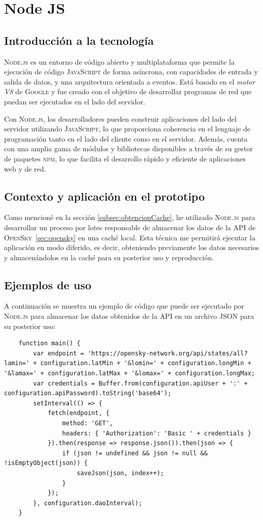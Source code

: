 \documentclass[a4paper, 11pt]{book}
\begin{document}
\section{Node JS}
\subsection{Introducción a la tecnología}
\textsc{Node.js} es un entorno de código abierto y multiplataforma que permite la ejecución de código \textsc{JavaScript} de forma asíncrona, con capacidades de entrada y salida de datos, y una arquitectura orientada a eventos. Está basado en el \emph{motor V8} de \textsc{Google} y fue creado con el objetivo de desarrollar programas de red que puedan ser ejecutados en el lado del servidor.

Con \textsc{Node.js}, los desarrolladores pueden construir aplicaciones del lado del servidor utilizando \textsc{JavaScript}, lo que proporciona coherencia en el lenguaje de programación tanto en el lado del cliente como en el servidor. Además, cuenta con una amplia gama de módulos y bibliotecas disponibles a través de su gestor de paquetes \textsc{\gls{npm}}, lo que facilita el desarrollo rápido y eficiente de aplicaciones web y de red.
\subsection{Contexto y aplicación en el prototipo}
Como mencioné en la sección \ref{subsec:obtencionCache}, he utilizado \textsc{Node.js} para desarrollar un proceso por lotes responsable de almacenar los datos de la \textsc{API} de \textsc{OpenSky}~\ref{sec:opensky} en una caché local. Esta técnica me permitirá ejecutar la aplicación en modo diferido, es decir, obteniendo previamente los datos necesarios y almacenándolos en la caché para su posterior uso y reproducción.
\subsection{Ejemplos de uso}
A continuación se muestra un ejemplo de código que puede ser ejecutado por \textsc{Node.js} para almacenar los datos obtenidos de la \textsc{API} en un archivo \textsc{\gls{JSON}} para su posterior uso:
\begin{verbatim}
	function main() {
		var endpoint = 'https://opensky-network.org/api/states/all?lamin=' + configuration.latMin + '&lomin=' + configuration.longMin + '&lamax=' + configuration.latMax + '&lomax=' + configuration.longMax;
		var credentials = Buffer.from(configuration.apiUser + ':' + configuration.apiPassword).toString('base64');
		setInterval(() => {
			fetch(endpoint, {
				method: 'GET',
				headers: { 'Authorization': 'Basic ' + credentials }
			}).then(response => response.json()).then(json => {
				if (json != undefined && json != null && !isEmptyObject(json)) {
					saveJson(json, index++);
				}
			});
		}, configuration.daoInterval);
	}
\end{verbatim}
\label{sec:nodejs}
\end{document}
